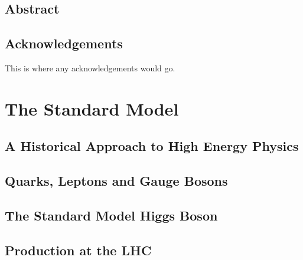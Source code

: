 \documentclass[oneside, letterpaper, 12pt, oldfontcommands]{memoir}
\begin{document}
\frontmatter


\thetitlepage
\clearpage

\thecopyrightpage
\cleardoublepage

\setcounter{page}{1}

\section{Abstract}
\uwabstract
\cleardoublepage

\section{Acknowledgements}
This is where any acknowledgements would go.
\clearpage

\tableofcontents* %

\mainmatter

\chapter{The Standard Model}
\section{A Historical Approach to High Energy Physics}
\section{Quarks, Leptons and Gauge Bosons}
\section{The Standard Model Higgs Boson}
\section{\bbbar Production at the LHC}
\end{document}

